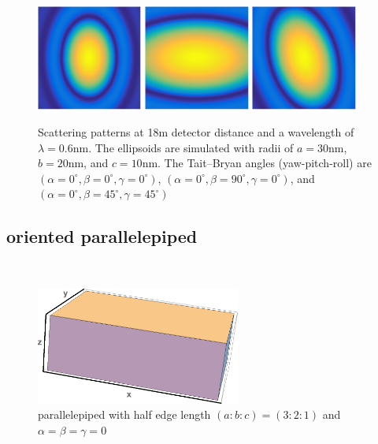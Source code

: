 \begin{figure}[htb] \includegraphics[width=0.31\textwidth]{../images/form_factor/supershapes/ellipsoid_0_0_0_18m.png}
\includegraphics[width=0.31\textwidth]{../images/form_factor/supershapes/ellipsoid_0_90_0_18m.png}   \includegraphics[width=0.31\textwidth]{../images/form_factor/supershapes/ellipsoid_0_45_45_18m.png}
\caption{Scattering patterns at 18m detector distance and a wavelength of $\lambda=0.6$nm. The ellipsoids are simulated with radii of $a=30$nm, $b=20$nm, and $c=10$nm. The Tait–Bryan angles (yaw-pitch-roll) are $(\alpha=0^\circ,\beta=0^\circ,\gamma=0^\circ)$, $(\alpha=0^\circ,\beta=90^\circ,\gamma=0^\circ)$, and $(\alpha=0^\circ,\beta=45^\circ,\gamma=45^\circ)$ }
\label{fig:opo_ellipsoidIQ2D}
\end{figure}

\subsection{oriented parallelepiped} ~\\

\begin{figure}[htb]
\begin{center}
\includegraphics[width=0.6\textwidth]{../images/form_factor/supershapes/parallel_epiped321.png}
\end{center}
\caption{parallelepiped with half edge length $(a:b:c)=(3:2:1)$ and $\alpha=\beta=\gamma=0$}
\label{fig:opo_cube}
\end{figure}

